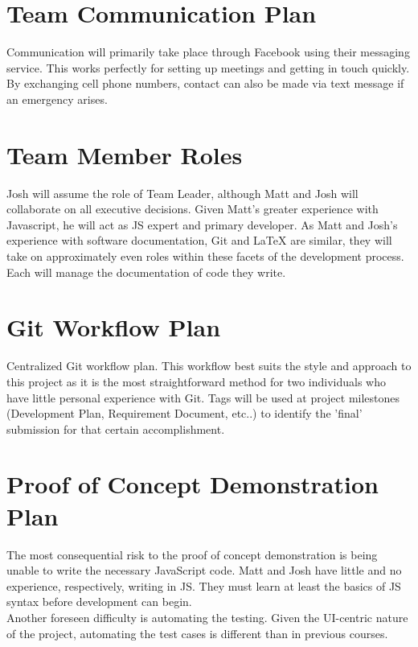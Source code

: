 \documentclass{article}
\begin{document}
	\section{Team Communication Plan}
	
	Communication will primarily take place through Facebook using their 
	messaging service. This 
	works perfectly for setting up meetings and getting in touch quickly. By exchanging 
	cell phone numbers, contact can also be made via text message if an 
	emergency arises. 
	
	\section{Team Member Roles}
	Josh will assume the role of Team Leader, although Matt and Josh will 
	collaborate on all executive 
	decisions. Given Matt's greater experience with Javascript, he will act as 
	JS expert and primary developer. As Matt and Josh's experience with 
	software 
	documentation, Git and LaTeX are similar, they will take on approximately 
	even roles within these facets of the development process. Each will manage 
	the documentation of code they write. 
	\section{Git Workflow Plan}
	
	Centralized Git workflow plan. This workflow best suits the style 
	and approach to this project as it is the most straightforward method for 
	two individuals 
	who have little personal experience with Git. Tags will be used at project
	milestones (Development Plan, Requirement Document, etc..) to identify the 
	'final'	submission for that certain accomplishment. 
	
	\section{Proof of Concept Demonstration Plan}
	The most consequential risk to the proof of concept demonstration is being 
	unable to write the necessary JavaScript code. Matt and Josh have 
	little and no experience, respectively, writing in JS. They must learn at 
	least the basics of JS syntax before development can begin.\\
	
	Another foreseen difficulty is automating the testing. Given the UI-centric 
	nature of the project, automating the test cases is different than in 
	previous courses.\\
	
\end{document}
